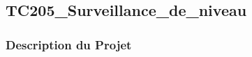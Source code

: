 \documentclass[a4paper,12pt]{report}
\begin{document}
\subsection{TC205\_Surveillance\_de\_niveau}
\begin{center}
\label{}
\end{center}
\subsubsection{Description du Projet}
\end{document}
